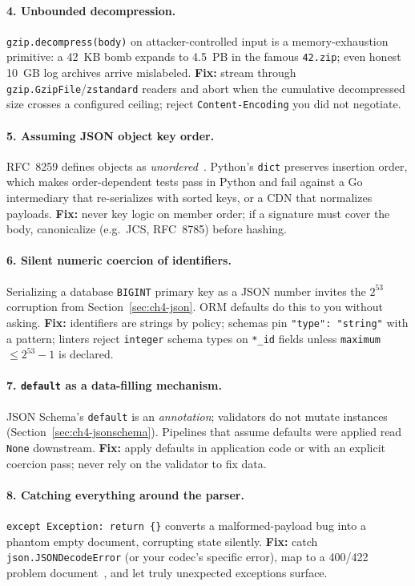 \paragraph{4. Unbounded decompression.}
\texttt{gzip.decompress(body)} on attacker-controlled input is a memory-exhaustion
primitive: a 42~KB bomb expands to 4.5~PB in the famous \texttt{42.zip}; even
honest 10~GB log archives arrive mislabeled. \textbf{Fix:} stream through
\texttt{gzip.GzipFile}/\texttt{zstandard} readers and abort when the cumulative
decompressed size crosses a configured ceiling; reject
\texttt{Content-Encoding} you did not negotiate.

\paragraph{5. Assuming JSON object key order.}
RFC~8259 defines objects as \emph{unordered}~\cite{rfc8259}. Python's
\texttt{dict} preserves insertion order, which makes order-dependent tests pass in
Python and fail against a Go intermediary that re-serializes with sorted keys, or a
CDN that normalizes payloads. \textbf{Fix:} never key logic on member order; if a
signature must cover the body, canonicalize (e.g.\ JCS, RFC~8785) before hashing.

\paragraph{6. Silent numeric coercion of identifiers.}
Serializing a database \texttt{BIGINT} primary key as a JSON number invites the
$2^{53}$ corruption from Section~\ref{sec:ch4-json}. ORM defaults do this to you
without asking. \textbf{Fix:} identifiers are strings by policy; schemas pin
\texttt{"type": "string"} with a pattern; linters reject \texttt{integer} schema
types on \texttt{*\_id} fields unless \texttt{maximum} $\le 2^{53}-1$ is declared.

\paragraph{7. \texttt{default} as a data-filling mechanism.}
JSON Schema's \texttt{default} is an \emph{annotation}; validators do not mutate
instances (Section~\ref{sec:ch4-jsonschema}). Pipelines that assume defaults were
applied read \texttt{None} downstream. \textbf{Fix:} apply defaults in application
code or with an explicit coercion pass; never rely on the validator to fix data.

\paragraph{8. Catching everything around the parser.}
\texttt{except Exception: return \{\}} converts a malformed-payload bug into a
phantom empty document, corrupting state silently. \textbf{Fix:} catch
\texttt{json.JSONDecodeError} (or your codec's specific error), map to a 400/422
problem document~\cite{rfc9457}, and let truly unexpected exceptions surface.

